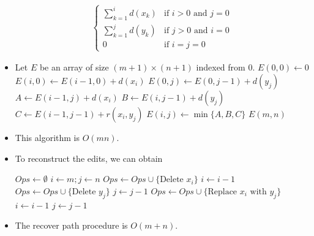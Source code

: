 \documentclass[a4paper,12pt]{article}
\begin{document}
\begin{itemize}
\begin{align}
\begin{cases}
            \sum_{k=1}^i d(x_k)&\text{if $i>0$ and $j=0$}\\
            \sum_{k=1}^j d(y_k)&\text{if $j>0$ and $i=0$}\\
            0&\text{if $i=j=0$}
        \end{cases}
    \end{align}
    \item {}\begin{algorithmic}[1]
        \State Let $E$ be an array of size $(m+1)\times(n+1)$ indexed from $0.$
        \State $E(0,0)\gets 0$
            \State $E(i,0)\gets E(i-1,0)+d(x_i)$
        \EndFor
            \State $E(0,j)\gets E(0,j-1)+d(y_j)$
        \EndFor
                \State $A\gets E(i-1,j)+d(x_i)$
                \State $B\gets E(i,j-1)+d(y_j)$
                \State $C\gets E(i-1,j-1)+r(x_i,y_j)$
                \State $E(i,j)\gets \min\{A,B,C\}$
            \EndFor
        \EndFor
        \State \Return $E(m,n)$
        \EndProcedure
    \end{algorithmic}
    \item This algorithm is $O(mn).$ 
    \item To reconstruct the edits, we can obtain \begin{algorithmic}[1]
        \State $Ops\gets\emptyset$
        \State $i\gets m; j\gets n$
                \State $Ops\gets Ops\cup\{\text{Delete $x_i$}\}$
                \State $i\gets i-1$
            \EndIf
                \State $Ops\gets Ops\cup\{\text{Delete $y_j$}\}$
                \State $j\gets j-1$
            \EndIf
                \State $Ops\gets Ops\cup\{\text{Replace $x_i$ with $y_j$}\}$
                \State $i\gets i-1$
                \State $j\gets j-1$
            \EndIf
        \EndWhile
        \EndProcedure
    \end{algorithmic}
    \item The recover path procedure is $O(m+n).$
\end{itemize}
\end{document}
